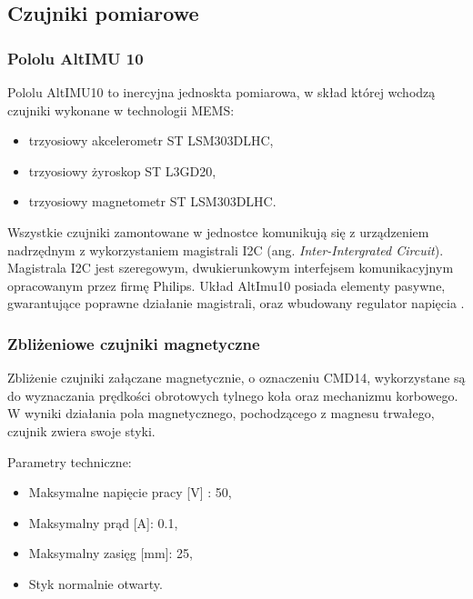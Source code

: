 \subsection{Czujniki pomiarowe}
\subsubsection{Pololu AltIMU 10}

Pololu AltIMU10 to inercyjna jednoskta pomiarowa, w skład której wchodzą czujniki wykonane w technologii MEMS:
\begin{itemize}
\item
trzyosiowy akcelerometr ST LSM303DLHC,
\item
trzyosiowy żyroskop ST L3GD20,
\item
trzyosiowy magnetometr ST LSM303DLHC.
\end{itemize}

Wszystkie czujniki zamontowane w jednostce komunikują się z urządzeniem nadrzędnym z wykorzystaniem magistrali I2C (ang. {\em Inter-Intergrated Circuit}). Magistrala I2C jest szeregowym, dwukierunkowym interfejsem komunikacyjnym opracowanym przez firmę Philips. Układ AltImu10 posiada elementy pasywne, gwarantujące poprawne działanie magistrali, oraz wbudowany regulator napięcia \cite{Pololu}.
\subsubsection{Zbliżeniowe czujniki magnetyczne}
Zbliżenie czujniki załączane magnetycznie, o oznaczeniu CMD14, wykorzystane są do wyznaczania prędkości obrotowych tylnego koła oraz mechanizmu korbowego. W wyniki działania pola magnetycznego, pochodzącego z magnesu trwałego, czujnik zwiera swoje styki. 
 
Parametry techniczne:
\begin{itemize}
\item
Maksymalne napięcie pracy [V] : 50,
\item
Maksymalny prąd [A]: 0.1,
\item
Maksymalny zasięg [mm]: 25,
\item
Styk normalnie otwarty.
\end{itemize}
